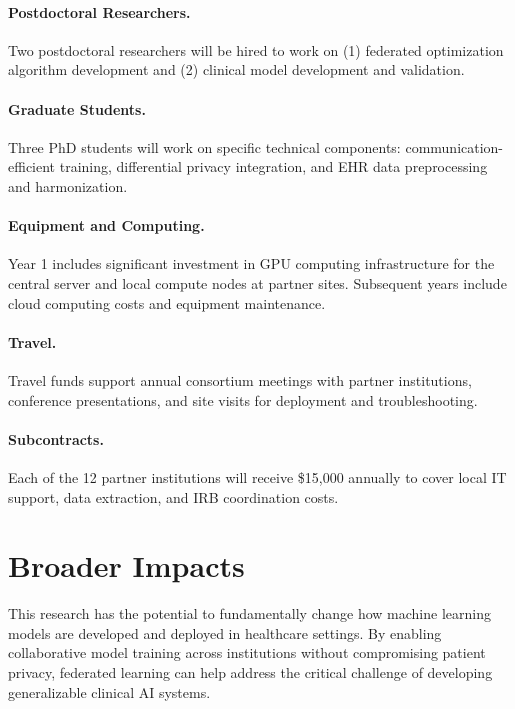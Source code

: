 \documentclass[12pt,letterpaper]{article}
\begin{document}
\paragraph{Postdoctoral Researchers.} Two postdoctoral researchers will be hired to work on (1) federated optimization algorithm development and (2) clinical model development and validation.

\paragraph{Graduate Students.} Three PhD students will work on specific technical components: communication-efficient training, differential privacy integration, and EHR data preprocessing and harmonization.

\paragraph{Equipment and Computing.} Year 1 includes significant investment in GPU computing infrastructure for the central server and local compute nodes at partner sites. Subsequent years include cloud computing costs and equipment maintenance.

\paragraph{Travel.} Travel funds support annual consortium meetings with partner institutions, conference presentations, and site visits for deployment and troubleshooting.

\paragraph{Subcontracts.} Each of the 12 partner institutions will receive \$15,000 annually to cover local IT support, data extraction, and IRB coordination costs.

\section{Broader Impacts}
\label{sec:impacts}

This research has the potential to fundamentally change how machine learning models are developed and deployed in healthcare settings. By enabling collaborative model training across institutions without compromising patient privacy, federated learning can help address the critical challenge of developing generalizable clinical AI systems.
\end{document}
